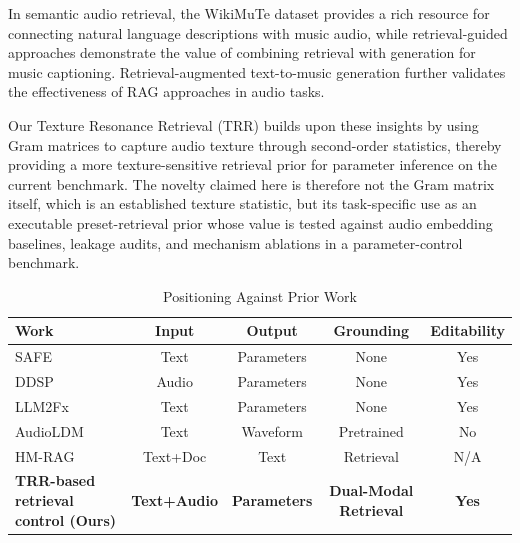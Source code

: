 In semantic audio retrieval, the WikiMuTe dataset \citep{weck2023wikimute} provides a rich resource for connecting natural language descriptions with music audio, while retrieval-guided approaches \citep{srivatsan2024retrieval} demonstrate the value of combining retrieval with generation for music captioning. Retrieval-augmented text-to-music generation \citep{gonzales2024rag} further validates the effectiveness of RAG approaches in audio tasks.

Our Texture Resonance Retrieval (TRR) builds upon these insights by using Gram matrices to capture audio texture through second-order statistics, thereby providing a more texture-sensitive retrieval prior for parameter inference on the current benchmark. The novelty claimed here is therefore not the Gram matrix itself, which is an established texture statistic, but its task-specific use as an executable preset-retrieval prior whose value is tested against audio embedding baselines, leakage audits, and mechanism ablations in a parameter-control benchmark.

\begin{table}[t]
			\centering
			\caption{Positioning Against Prior Work}
			\label{tab:positioning}
		\small
		\begin{tabular}{lcccc}
		\toprule
		\textbf{Work}               & \textbf{Input}      & \textbf{Output}     & \textbf{Grounding}      & \textbf{Editability} \\
		\midrule
		SAFE \citep{stables2014semantic}             & Text                                 & Parameters                           & None                                     & Yes                                   \\
		DDSP \citep{engel2020ddsp}                   & Audio                                & Parameters                           & None                                     & Yes                                   \\
		LLM2Fx \citep{doh2025llm2fx}                 & Text                                 & Parameters                           & None                                     & Yes                                   \\
		AudioLDM \citep{liu2023audioldm}             & Text                                 & Waveform                             & Pretrained                               & No                                    \\
		HM-RAG \citep{liu2025hmrag}                  & Text+Doc                             & Text                                 & Retrieval                                & N/A                                   \\
			\midrule
			\textbf{TRR-based retrieval control (Ours)} & \textbf{Text+Audio} & \textbf{Parameters} & \textbf{Dual-Modal Retrieval} & \textbf{Yes}         \\
			\bottomrule
		\end{tabular}
\end{table}

